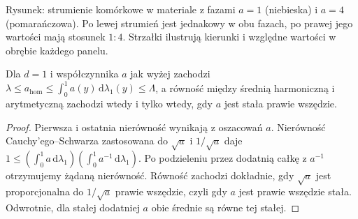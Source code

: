 \begin{center}

{\small Rysunek: strumienie komórkowe w materiale z fazami
$a=1$ (niebieska) i $a=4$ (pomarańczowa).
Po lewej strumień jest jednakowy w obu fazach,
po prawej jego wartości mają stosunek $1:4$.
Strzałki ilustrują kierunki i względne wartości
w obrębie każdego panelu.}
\end{center}

\begin{stwierdzenie}
\label{prop:pde30-bounds}
Dla $d=1$ i współczynnika $a$ jak wyżej zachodzi
$\lambda\le a_{\mathrm{hom}}\le\int_0^1 a(y)
\,\mathrm d\lambda_1(y)\le\Lambda$,
a równość między średnią harmoniczną i arytmetyczną
zachodzi wtedy i tylko wtedy, gdy $a$ jest stała prawie wszędzie.
\end{stwierdzenie}
\begin{proof}
Pierwsza i ostatnia nierówność wynikają z oszacowań $a$.
Nierówność Cauchy'ego--Schwarza zastosowana do
$\sqrt a$ i $1/\sqrt a$ daje
$1\le(\int_0^1a\,\mathrm d\lambda_1)
(\int_0^1a^{-1}\,\mathrm d\lambda_1)$.
Po podzieleniu przez dodatnią całkę z $a^{-1}$
otrzymujemy żądaną nierówność.
Równość zachodzi dokładnie, gdy $\sqrt a$ jest
proporcjonalna do $1/\sqrt a$ prawie wszędzie,
czyli gdy $a$ jest prawie wszędzie stała.
Odwrotnie, dla stałej dodatniej $a$ obie średnie
są równe tej stałej.
\end{proof}

